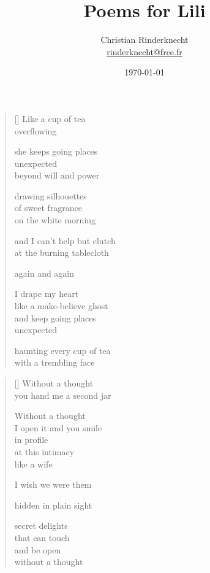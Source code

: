 \documentclass[12pt,a4paper]{article}
\title{Poems for Lili}
\author{Christian Rinderknecht\\
{\small \url{rinderknecht@free.fr}}}
\date{\today}
\begin{document}
\maketitle

\thispagestyle{empty}

\newpage\leavevmode\thispagestyle{empty}\newpage


\newpage

\poemtitle{}

\settowidth{\versewidth}{Like a make-believe ghost}

\bigskip

\begin{verse}[\versewidth]
  Like a cup of tea \\
  overflowing

  she keeps going places \\
  unexpected \\
  beyond will and power

  drawing silhouettes \\
  of sweet fragrance \\
  on the white morning

  and I can't help but clutch \\
  at the burning tablecloth

  again and again

  I drape my heart \\
  like a make-believe ghost \\
  and keep going places \\
  unexpected

  haunting every cup of tea \\
  with a trembling face
\end{verse}


\newpage

\poemtitle{}

\settowidth{\versewidth}{You hand me a second jar}

\bigskip

\begin{verse}[\versewidth]
  Without a thought \\
  you hand me a second jar

  Without a thought \\
  I open it and you smile \\
  in profile \\
  at this intimacy \\
  like a wife

  I wish we were them

  hidden in plain sight

  secret delights \\
  that can touch \\
  and be open \\
  without a thought
\end{verse}
\end{document}
